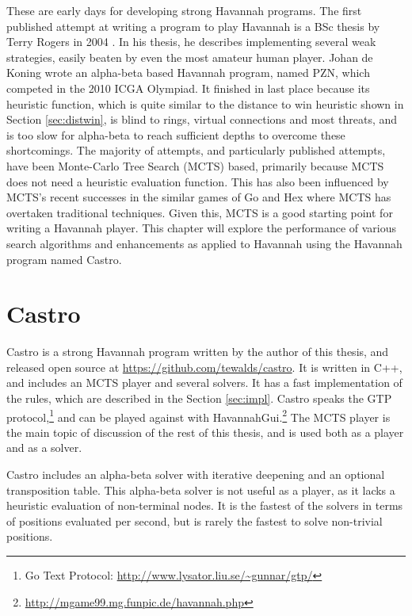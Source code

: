 

These are early days for developing strong Havannah programs. The first published attempt at writing a program to play Havannah is a BSc thesis by Terry Rogers in 2004 \cite{rogers2004bsc}. In his thesis, he describes implementing several weak strategies, easily beaten by even the most amateur human player. Johan de Koning wrote an alpha-beta based Havannah program, named PZN, which competed in the 2010 ICGA Olympiad. It finished in last place because its heuristic function, which is quite similar to the distance to win heuristic shown in Section \ref{sec:distwin}, is blind to rings, virtual connections and most threats, and is too slow for alpha-beta to reach sufficient depths to overcome these shortcomings. The majority of attempts, and particularly published attempts, have been Monte-Carlo Tree Search (MCTS) based, primarily because MCTS does not need a heuristic evaluation function. This has also been influenced by MCTS's recent successes in the similar games of Go and Hex where MCTS has overtaken traditional techniques. Given this, MCTS is a good starting point for writing a Havannah player. This chapter will explore the performance of various search algorithms and enhancements as applied to Havannah using the Havannah program named Castro.


\section{Castro}

Castro is a strong Havannah program written by the author of this thesis, and released open source at \url{https://github.com/tewalds/castro}. It is written in C++, and includes an MCTS player and several solvers. It has a fast implementation of the rules, which are described in the Section \ref{sec:impl}. Castro speaks the GTP protocol,\footnote{Go Text Protocol: \url{http://www.lysator.liu.se/~gunnar/gtp/}} and can be played against with HavannahGui.\footnote{\url{http://mgame99.mg.funpic.de/havannah.php}} The MCTS player is the main topic of discussion of the rest of this thesis, and is used both as a player and as a solver.

Castro includes an alpha-beta solver with iterative deepening and an optional transposition table. This alpha-beta solver is not useful as a player, as it lacks a heuristic evaluation of non-terminal nodes. It is the fastest of the solvers in terms of positions evaluated per second, but is rarely the fastest to solve non-trivial positions.

